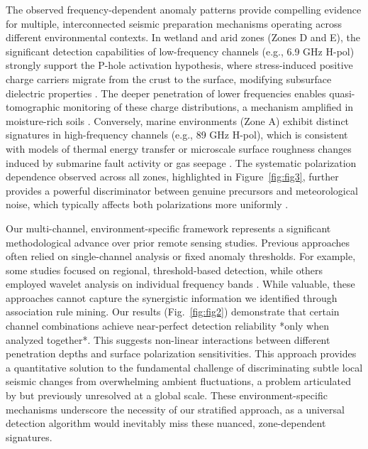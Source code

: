 \documentclass[preprint,review,12pt,authoryear]{elsarticle}
\begin{document}
The observed frequency-dependent anomaly patterns provide compelling evidence for multiple, interconnected seismic preparation mechanisms operating across different environmental contexts. In wetland and arid zones (Zones D and E), the significant detection capabilities of low-frequency channels (e.g., 6.9 GHz H-pol) strongly support the P-hole activation hypothesis, where stress-induced positive charge carriers migrate from the crust to the surface, modifying subsurface dielectric properties \citep{freundPreearthquakeSignalsUnderlying2011,maoImpactCompressiveStress2020}. The deeper penetration of lower frequencies enables quasi-tomographic monitoring of these charge distributions, a mechanism amplified in moisture-rich soils \citep{jingChangesSurfaceWater2022}. Conversely, marine environments (Zone A) exhibit distinct signatures in high-frequency channels (e.g., 89 GHz H-pol), which is consistent with models of thermal energy transfer or microscale surface roughness changes induced by submarine fault activity or gas seepage \citep{liuGeneralFeaturesMultiparameter2023}. The systematic polarization dependence observed across all zones, highlighted in Figure~\ref{fig:fig3}, further provides a powerful discriminator between genuine precursors and meteorological noise, which typically affects both polarizations more uniformly \citep{lixinProgressesPossibleFrontiers2022}.

Our multi-channel, environment-specific framework represents a significant methodological advance over prior remote sensing studies. Previous approaches often relied on single-channel analysis or fixed anomaly thresholds. For example, some studies focused on regional, threshold-based detection, while others employed wavelet analysis on individual frequency bands \citep{liuPreearthquakeMBTAnomalies2023,wuIdentifyingSeismicAnomalies2024}. While valuable, these approaches cannot capture the synergistic information we identified through association rule mining. Our results (Fig.~\ref{fig:fig2}) demonstrate that certain channel combinations achieve near-perfect detection reliability *only when analyzed together*. This suggests non-linear interactions between different penetration depths and surface polarization sensitivities. This approach provides a quantitative solution to the fundamental challenge of discriminating subtle local seismic changes from overwhelming ambient fluctuations, a problem articulated by \citet{maedaDiscriminationLocalFaint2008} but previously unresolved at a global scale. These environment-specific mechanisms underscore the necessity of our stratified approach, as a universal detection algorithm would inevitably miss these nuanced, zone-dependent signatures.
\end{document}
